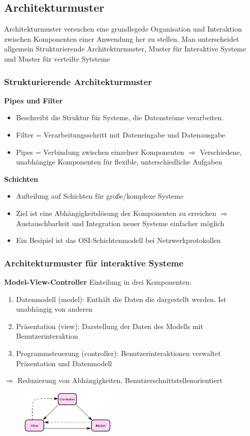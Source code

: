 \documentclass[a4paper,10pt]{scrartcl}
\begin{document}
\subsection{Architekturmuster}
Architekturmuster versuchen eine grundlegede Organisation und Interaktion zwischen Komponenten einer Anwendung her zu stellen. Man unterscheidet allgemein Strukturierende Architekturmuster, Muster für Interaktive Systeme und Muster für verteilte Sytsteme

\subsubsection{Strukturierende Architekturmuster}
\textbf{Pipes und Filter}
\begin{itemize}
    \item Beschreibt die Struktur für Systeme, die Datenströme verarbeiten.
    \item Filter = Verarbeitungsschritt mit Dateneingabe und Datenausgabe
    \item Pipes = Verbindung zwischen einzelner Komponenten \newline
    $\Rightarrow$ Verschiedene, unabhängige Komponenten für flexible, unterschiedliche Aufgaben
\end{itemize}
\textbf{Schichten}
\begin{itemize}
    \item Aufteilung auf Schichten für große/komplexe Systeme 
    \item Ziel ist eine Abhängigkeitslösung der Komponenten zu erreichen\newline
    $\Rightarrow$ Austauschbarkeit und Integration neuer Systeme einfacher möglich
    \item Ein Besipiel ist das OSI-Schichtenmodell bei Netzwerkprotokollen
\end{itemize}
\subsubsection{Architekturmuster für interaktive Systeme}
\textbf{Model-View-Controller}\newline
Einteilung in drei Komponenten:
\begin{enumerate}
    \item Datenmodell (model): Enthält die Daten die dargestellt werden. Ist unabhängig von anderen
    \item Präsentation (view): Darstellung der Daten des Modells mit Benutzerinteraktion
    \item Programmsteuerung (controller): Benutzerinteraktionen verwaltet Präsentation und Datenmodell
\end{enumerate}
$\Rightarrow$ Reduzierung von Abhängigkeiten, Benutzerschnittstellenorientiert  \newline
\begin{figure}[h]
	\centering
	\includegraphics[width = 4.5cm]{ModelViewControllerDiagram2}
\end{figure}
\newpage
\end{document}
